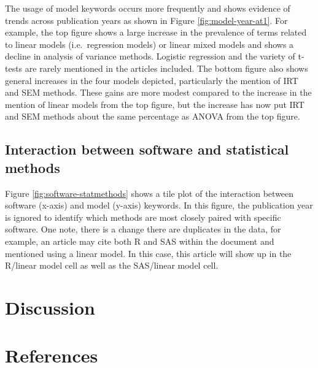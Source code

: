 \documentclass[english,,man]{apa6}
\theoremstyle{definition}
\theoremstyle{definition}
\theoremstyle{definition}
\theoremstyle{remark}
\begin{document}
The usage of model keywords occurs more frequently and shows evidence of
trends across publication years as shown in Figure
\ref{fig:model-year-at1}. For example, the top figure shows a large
increase in the prevalence of terms related to linear models
(i.e.~regression models) or linear mixed models and shows a decline in
analysis of variance methods. Logistic regression and the variety of
t-tests are rarely mentioned in the articles included. The bottom figure
also shows general increases in the four models depicted, particularly
the mention of IRT and SEM methods. These gains are more modest compared
to the increase in the mention of linear models from the top figure, but
the increase has now put IRT and SEM methods about the same percentage
as ANOVA from the top figure.

\hypertarget{interaction-between-software-and-statistical-methods}{%
\subsection{Interaction between software and statistical
methods}\label{interaction-between-software-and-statistical-methods}}

Figure \ref{fig:software-statmethods} shows a tile plot of the
interaction between software (x-axis) and model (y-axis) keywords. In
this figure, the publication year is ignored to identify which methods
are most closely paired with specific software. One note, there is a
change there are duplicates in the data, for example, an article may
cite both R and SAS within the document and mentioned using a linear
model. In this case, this article will show up in the R/linear model
cell as well as the SAS/linear model cell.

\hypertarget{discussion}{%
\section{Discussion}\label{discussion}}

\hypertarget{references}{%
\section{References}\label{references}}

\setlength{\parindent}{-0.5in}
\setlength{\leftskip}{0.5in}
\end{document}
